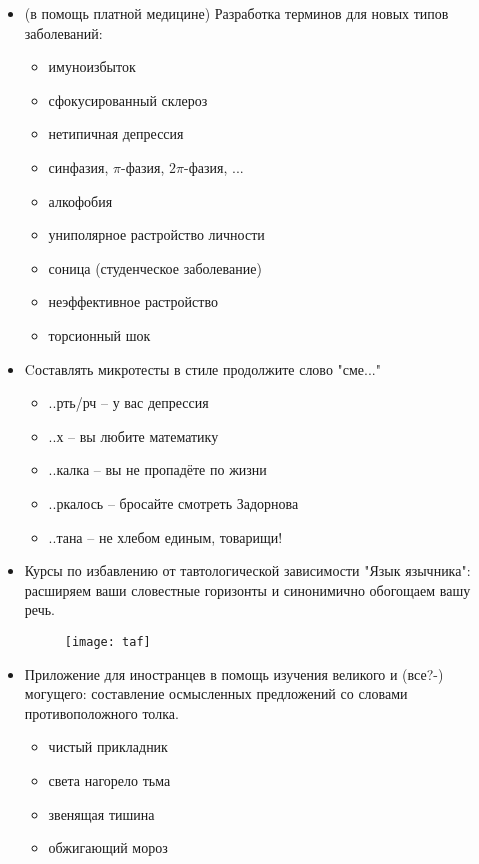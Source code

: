 \begin{itemize}
    \item (в помощь платной медицине) Разработка терминов для новых типов заболеваний:
        \begin{itemize}
            \item имуноизбыток
            \item сфокусированный склероз
            \item нетипичная депрессия
            \item синфазия, $\pi$-фазия, $2\pi$-фазия, ...
            \item алкофобия
            \item униполярное растройство личности
            \item соница (студенческое заболевание)
            \item неэффективное растройство
            \item торсионный шок
        \end{itemize}
    \item Cоставлять микротесты в стиле продолжите слово "сме..."
    \begin{itemize}
        \item[] ..рть/рч -- у вас депрессия
        \item[] ..х -- вы любите математику
        \item[] ..калка -- вы не пропадёте по жизни
        \item[] ..ркалось -- бросайте смотреть Задорнова
        \item[] ..тана -- не хлебом единым, товарищи!
    \end{itemize}
    \item Курсы по избавлению от тавтологической зависимости "Язык язычника": расширяем ваши словестные горизонты и синонимично обогощаем вашу речь.
    \begin{figure}[ht!]
        \centering
        \texttt{[image: taf]}
    \end{figure}
    \item Приложение для иностранцев в помощь изучения великого и (все?-) могущего: составление осмысленных предложений со словами противоположного толка.
        \begin{itemize}
            \item чистый прикладник
            \item света нагорело тьма
            \item звенящая тишина
            \item обжигающий мороз

\end{itemize}
\end{itemize}
